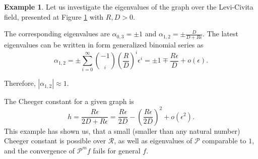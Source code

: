 \documentclass[a4paper,12pt]{amsart}
\theoremstyle{definition}
\newtheorem{example}{Example}
\renewcommand{\P}{\mathcal{P}}
\newcommand{\R}{\mathcal{R}}
\begin{document}
\begin{example}
Let us investigate the eigenvalues of the graph  over the Levi-Civita field, presented at Figure \ref{Fig2} with $R,D>0$.
\begin{figure}[H]\label{Fig2}
\centering
{}
\caption{}
\end{figure}
The corresponding eigenvalues are $\alpha_{0,3}=\pm 1$ and $\alpha_{1,2}=\pm {\frac{D}{D+R\epsilon}}$. The latest eigenvalues can be written in form generalized  binomial series as 
$$
\alpha_{1,2}=\pm \sum_{i=0}^\infty {{-1} \choose_i}\left(\dfrac{R}{D}\right)^i \epsilon^{i}=\pm 1\mp\frac{R\epsilon}{D}+o(\epsilon).
$$
 

Therefore, $|\alpha_{1,2}|\approx 1$.


The Cheeger constant for a given graph is 
$$
h=\frac{R\epsilon}{2D+R\epsilon}=\frac{R\epsilon}{2D}-\left(\frac{R\epsilon}{2D}\right)^2+o(\epsilon^2).
$$
This example has shown us, that a small (smaller than any natural number) Cheeger constant is possible over $\R$, as well as eigenvalues of $\P$ comparable to $1$, and the convergence of $\P^m f$ fails for general $f$.
\end{example}
\end{document}
